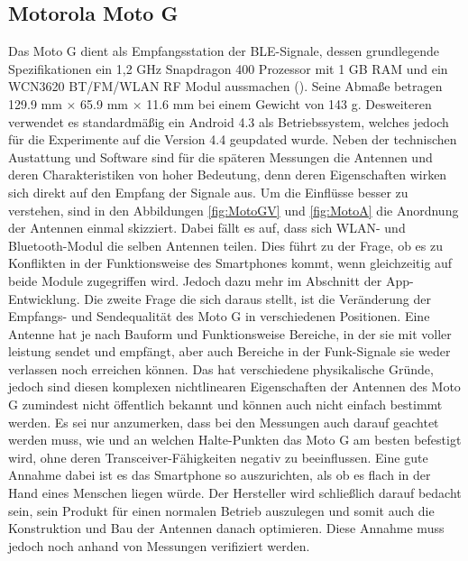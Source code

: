 \subsection{Motorola Moto G}
Das Moto G dient als Empfangsstation der BLE-Signale, dessen grundlegende Spezifikationen ein 1,2 GHz Snapdragon 400 Prozessor mit 1 GB RAM und ein WCN3620 BT/FM/WLAN RF Modul aussmachen (\cite{Moto}). Seine Abmaße betragen 129.9 mm $\times$ 65.9 mm $\times$ 11.6  mm bei einem Gewicht von 143 g. Desweiteren verwendet es standardmäßig ein Android 4.3 als Betriebssystem, welches jedoch für die Experimente auf die Version 4.4 geupdated wurde. Neben der technischen Austattung und Software sind für die späteren Messungen die Antennen und deren Charakteristiken von hoher Bedeutung, denn deren Eigenschaften wirken sich direkt auf den Empfang der Signale aus. Um die Einflüsse besser zu verstehen, sind in den Abbildungen \ref{fig:MotoGV} und \ref{fig:MotoA} die Anordnung der Antennen einmal skizziert. Dabei fällt es auf, dass sich WLAN- und Bluetooth-Modul die selben Antennen teilen. Dies führt zu der Frage, ob es zu Konflikten in der Funktionsweise des Smartphones kommt, wenn gleichzeitig auf beide Module zugegriffen wird. Jedoch dazu mehr im Abschnitt der App-Entwicklung. Die zweite Frage die sich daraus stellt, ist die Veränderung der Empfangs- und Sendequalität des Moto G in verschiedenen Positionen. Eine Antenne hat je nach Bauform und Funktionsweise Bereiche, in der sie mit voller leistung sendet und empfängt, aber auch Bereiche in der Funk-Signale sie weder verlassen noch erreichen können. Das hat verschiedene physikalische Gründe, jedoch sind diesen komplexen nichtlinearen Eigenschaften der Antennen des Moto G zumindest nicht öffentlich bekannt und können auch nicht einfach bestimmt werden. Es sei nur anzumerken, dass bei den Messungen auch darauf geachtet werden muss, wie und an welchen Halte-Punkten das Moto G am besten befestigt wird, ohne deren Transceiver-Fähigkeiten negativ zu beeinflussen. Eine gute Annahme dabei ist es das Smartphone so auszurichten, als ob es flach in der Hand eines Menschen liegen würde. Der Hersteller wird schließlich darauf bedacht sein, sein Produkt für einen normalen Betrieb auszulegen und somit auch die Konstruktion und Bau der Antennen danach optimieren. Diese Annahme muss jedoch noch anhand von Messungen verifiziert werden.
